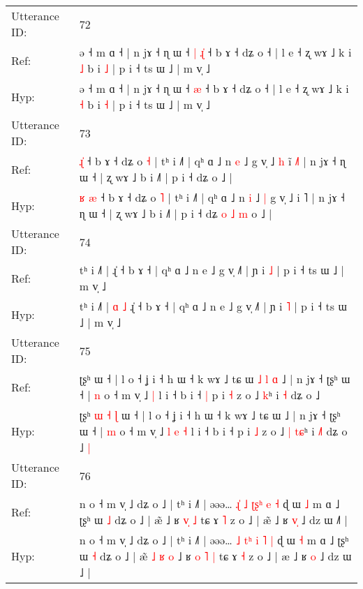 \documentclass[10pt]{article}
\DeclareRobustCommand{\hl}[1]{{\textcolor{red}{#1}}}
\begin{document}
\begin{longtable}{ll}
 \\
\midrule
Utterance ID: & 72 \\
Ref: & ə ˧ m ɑ ˧ | n jɤ ˧ ɳ ɯ ˧\hl{ }\hl{|} \hl{ɻ}\hl{̍} ˧ b ɤ ˧ dʑ o ˧ | l e ˧ ʐ wɤ ˩ k i \hl{˩} b i \hl{˩} | p i ˧ ts ɯ ˩ | m v̩ ˩
 \\
Hyp: & ə ˧ m ɑ ˧ | n jɤ ˧ ɳ ɯ ˧\hl{}\hl{} \hl{}\hl{æ} ˧ b ɤ ˧ dʑ o ˧ | l e ˧ ʐ wɤ ˩ k i \hl{˧} b i \hl{˧} | p i ˧ ts ɯ ˩ | m v̩ ˩
 \\
\midrule
Utterance ID: & 73 \\
Ref: & \hl{}\hl{ɻ}\hl{̍} ˧ b ɤ ˧ dʑ o \hl{˧} | tʰ i ˩˥ | qʰ ɑ ˩ n \hl{e} ˩\hl{}\hl{} g v̩ ˩\hl{ }\hl{h} i\hl{̃} \hl{˩}˥ | n jɤ ˧ ɳ ɯ ˧ | ʐ wɤ ˩ b i ˩˥ | p i ˧ dʑ\hl{}\hl{}\hl{}\hl{}\hl{}\hl{} o ˩ |
 \\
Hyp: & \hl{ʁ}\hl{ }\hl{æ} ˧ b ɤ ˧ dʑ o \hl{˥} | tʰ i ˩˥ | qʰ ɑ ˩ n \hl{i} ˩\hl{ }\hl{|} g v̩ ˩\hl{}\hl{} i\hl{} \hl{}˥ | n jɤ ˧ ɳ ɯ ˧ | ʐ wɤ ˩ b i ˩˥ | p i ˧ dʑ\hl{ }\hl{o}\hl{ }\hl{˩}\hl{ }\hl{m} o ˩ |
 \\
\midrule
Utterance ID: & 74 \\
Ref: & tʰ i ˩˥ |\hl{}\hl{}\hl{}\hl{} ɻ̍ ˧ b ɤ ˧ | qʰ ɑ ˩ n e ˩ g v̩ ˩˥ | ɲ i \hl{˩} | p i ˧ ts ɯ ˩ | m v̩ ˩
 \\
Hyp: & tʰ i ˩˥ |\hl{ }\hl{ɑ}\hl{ }\hl{˩} ɻ̍ ˧ b ɤ ˧ | qʰ ɑ ˩ n e ˩ g v̩ ˩˥ | ɲ i \hl{˥} | p i ˧ ts ɯ ˩ | m v̩ ˩
 \\
\midrule
Utterance ID: & 75 \\
Ref: & ʈʂʰ\hl{}\hl{}\hl{}\hl{}\hl{}\hl{} ɯ ˧ | l o ˧ ʝ i ˧ h ɯ ˧ k wɤ ˩ tɕ ɯ\hl{ }\hl{˩}\hl{ }\hl{l}\hl{ }\hl{ɑ} ˩ | n jɤ ˧ ʈʂʰ ɯ ˧ | \hl{n} o ˧ m v̩ ˩\hl{}\hl{}\hl{}\hl{} \hl{|} l i ˧ b i ˧\hl{ }\hl{|} p i \hl{˧} z o ˩\hl{}\hl{} \hl{}\hl{k}ʰ i \hl{}\hl{˧} dʑ o ˩\hl{}\hl{}
 \\
Hyp: & ʈʂʰ\hl{ }\hl{ɯ}\hl{ }\hl{˧}\hl{ }\hl{ɭ} ɯ ˧ | l o ˧ ʝ i ˧ h ɯ ˧ k wɤ ˩ tɕ ɯ\hl{}\hl{}\hl{}\hl{}\hl{}\hl{} ˩ | n jɤ ˧ ʈʂʰ ɯ ˧ | \hl{m} o ˧ m v̩ ˩\hl{ }\hl{l}\hl{ }\hl{e} \hl{˧} l i ˧ b i ˧\hl{}\hl{} p i \hl{˩} z o ˩\hl{ }\hl{|} \hl{t}\hl{ɕ}ʰ i \hl{˩}\hl{˥} dʑ o ˩\hl{ }\hl{|}
 \\
\midrule
Utterance ID: & 76 \\
Ref: & n o ˧ m v̩ ˩ dʑ o ˩ | tʰ i ˩˥ | əəə… \hl{ɻ}\hl{̍} \hl{˩}\hl{ }\hl{ʈ}\hl{ʂ}\hl{ʰ} \hl{e} \hl{˧} ɖ ɯ \hl{˩} m ɑ ˩ ʈʂʰ ɯ \hl{˩} dʑ o ˩ | æ̃\hl{}\hl{}\hl{}\hl{}\hl{}\hl{} ˩ ʁ \hl{}\hl{v}\hl{̩} \hl{˩} tɕ ɤ \hl{˥} z o ˩ | æ\hl{̃} ˩ ʁ \hl{v}\hl{̩} ˩ dz ɯ ˩\hl{˥} |
 \\
Hyp: & n o ˧ m v̩ ˩ dʑ o ˩ | tʰ i ˩˥ | əəə… \hl{}\hl{˩} \hl{}\hl{t}\hl{ʰ}\hl{ }\hl{i} \hl{˥} \hl{|} ɖ ɯ \hl{˧} m ɑ ˩ ʈʂʰ ɯ \hl{˧} dʑ o ˩ | æ̃\hl{ }\hl{˩}\hl{ }\hl{ʁ}\hl{ }\hl{o} ˩ ʁ \hl{o}\hl{ }\hl{˥} \hl{|} tɕ ɤ \hl{˧} z o ˩ | æ\hl{} ˩ ʁ \hl{}\hl{o} ˩ dz ɯ ˩\hl{} |

\end{longtable}
\end{document}
